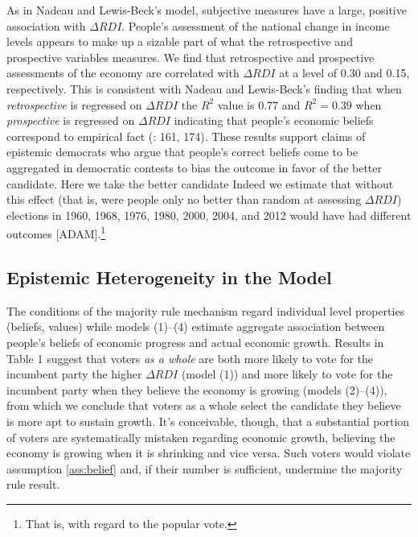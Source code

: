 \documentclass[11pt]{article}
\begin{document}
As in Nadeau and Lewis-Beck's model, subjective measures have a large, positive association with $\Delta RDI$.
 People's assessment of the national change in income levels appears to make up a sizable part of what the retrospective and prospective variables measures. 
 We find that retrospective and prospective assessments of the economy are correlated with $\Delta RDI$ at a level of 0.30 and 0.15, respectively.
  This is consistent with Nadeau and Lewis-Beck's finding that when \emph{retrospective} is regressed on $\Delta RDI$ the $R^2$ value is 0.77 and $R^2=0.39$ when \emph{prospective} is regressed on $\Delta RDI$  indicating that people's economic beliefs correspond to empirical fact (\cite{Nadeau:2001tw}: 161, 174). 
These results support claims of epistemic democrats who argue that people's correct beliefs come to be aggregated in democratic contests to bias the outcome in favor of the better candidate. Here we take the better candidate Indeed we estimate that without this effect (that is, were people only no better than random at assessing $\Delta RDI$) elections in 1960, 1968, 1976, 1980, 2000, 2004, and 2012 would have had different outcomes [ADAM].\footnote{That is, with regard to the popular vote.} 

\subsection{Epistemic Heterogeneity in the Model}\label{sec:heterogeneity}
The conditions of the majority rule mechanism regard individual level
properties (beliefs, values) while  models (1)--(4) estimate
aggregate association between people's beliefs of economic progress
and actual economic growth. Results in Table 1 suggest that voters \emph{as a whole} are both more likely to vote
for the incumbent party the higher $\Delta RDI$ (model (1)) and more
likely to vote for the incumbent party when they believe the economy
is growing (models (2)--(4)), from which we conclude that voters as
a whole select the candidate they believe is more apt to sustain growth. It's conceivable, though, that a substantial portion of voters are
systematically mistaken regarding economic growth, believing the
economy is growing when it is shrinking and vice versa. 
Such voters would violate assumption \ref{ass:belief} and, if their number
is sufficient, undermine the majority rule result.
\end{document}
